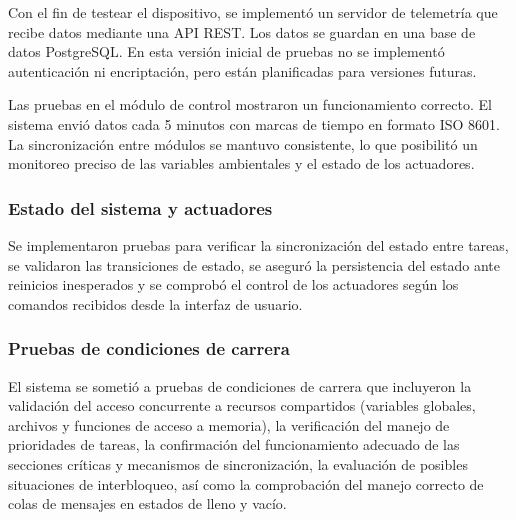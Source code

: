 Con el fin de testear el dispositivo, se implementó un servidor de telemetría que recibe datos mediante una API REST. Los datos se guardan en una base de datos PostgreSQL. En esta versión inicial de pruebas no se implementó autenticación ni encriptación, pero están planificadas para versiones futuras.




Las pruebas en el módulo de control mostraron un funcionamiento correcto. El sistema envió datos cada 5 minutos con marcas de tiempo en formato ISO 8601. La sincronización entre módulos se mantuvo consistente, lo que posibilitó un monitoreo preciso de las variables ambientales y el estado de los actuadores.

\subsubsection{Estado del sistema y actuadores}
Se implementaron pruebas para verificar la sincronización del estado entre tareas, se validaron las transiciones de estado, se aseguró la persistencia del estado ante reinicios inesperados y se comprobó el control de los actuadores según los comandos recibidos desde la interfaz de usuario.

\subsubsection{Pruebas de condiciones de carrera}
El sistema se sometió a pruebas de condiciones de carrera que incluyeron la validación del acceso concurrente a recursos compartidos (variables globales, archivos y funciones de acceso a memoria), la verificación del manejo de prioridades de tareas, la confirmación del funcionamiento adecuado de las secciones críticas y mecanismos de sincronización, la evaluación de posibles situaciones de interbloqueo, así como la comprobación del manejo correcto de colas de mensajes en estados de lleno y vacío.

